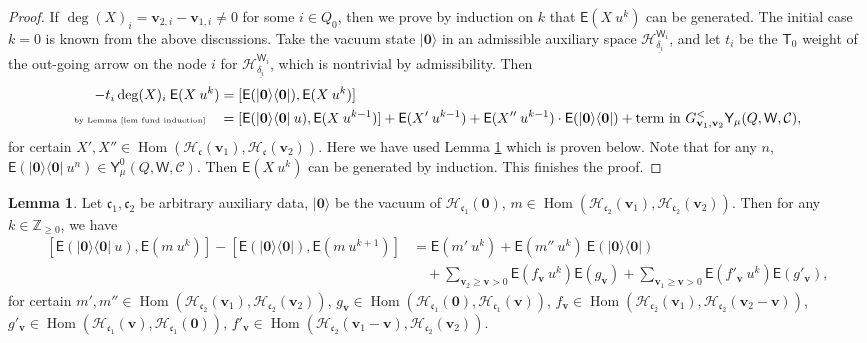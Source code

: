 \documentclass[10pt]{amsart}
\theoremstyle{definition}
\newtheorem{Lemma}[Theorem]{Lemma}
\numberwithin{equation}{section}
\newcommand{\bZ}{\mathbb{Z}}
\newcommand{\bv}{\mathbf{v}}
\newcommand{\cH}{\mathcal{H}}
\newcommand{\sT}{\mathsf{T}}
\newcommand{\sW}{\mathsf{W}}
\newcommand{\Hom}{\operatorname{Hom}}
\begin{document}
\begin{proof}
If $\deg(X)_i=\bv_{2,i}-\bv_{1,i}\neq 0$ for some $i\in Q_0$, then we prove by induction on $k$ that $\mathsf E(X\: u^k)$ can be generated. The initial case $k=0$ is known from the above discussions. Take the vacuum state $|\mathbf 0\rangle$ in an admissible auxiliary space $\cH^{\sW_i}_{\underline{\delta_i}}$, and let $t_i$ be the $\sT_0$ weight of the out-going arrow on the node $i$ for $\cH^{\sW_i}_{\underline{\delta_i}}$, which is nontrivial by admissibility. Then 
\begin{align*}
    -t_i\deg(X)_i\:\mathsf E(X\:u^k)&=[\mathsf E(|\mathbf 0\rangle\langle\mathbf 0|),\mathsf E(X\:u^k)]\\
    \text{\tiny by Lemma \ref{lem fund induction}}\quad&=[\mathsf E(|\mathbf 0\rangle\langle\mathbf 0|\:u),\mathsf E(X\: u^{k-1})]+\mathsf E(X'\: u^{k-1})+\mathsf E(X''\: u^{k-1})\cdot\mathsf E(|\mathbf 0\rangle\langle\mathbf 0|)+\text{term in }G^<_{\bv_1,\bv_2}\mathsf Y_\mu(Q,\sW,\mathcal C),
\end{align*}
for certain $X',X''\in \Hom(\cH_{\mathfrak{c}}(\bv_1),\cH_{\mathfrak{c}}(\bv_2))$. Here we have used Lemma \ref{lem fund induction} which is proven below. Note that for any $n$, $\mathsf E(|\mathbf 0\rangle\langle\mathbf 0|\:u^n)\in \mathsf Y^0_\mu(Q,\sW,\mathcal C)$. Then $\mathsf E(X\:u^k)$ can be generated by induction. This finishes the proof.
\end{proof}


\begin{Lemma}\label{lem fund induction}
Let $\mathfrak{c}_1,\mathfrak{c}_2$ be arbitrary auxiliary data, $|\mathbf 0\rangle$ be the vacuum of $ \cH_{\mathfrak{c}_1}(\mathbf 0)$, $m\in \Hom(\cH_{\mathfrak{c}_2}(\bv_1),\cH_{\mathfrak{c}_2}(\bv_2))$. Then for any $k\in \bZ_{\geqslant 0}$, we have
\begin{align}\label{fund induction}
[\mathsf E(|\mathbf 0\rangle\langle\mathbf 0|\: u),\mathsf E(m\: u^{k})]-[\mathsf E(|\mathbf 0\rangle\langle\mathbf 0|),\mathsf E(m\: u^{k+1})]&=\mathsf E(m'\: u^{k})+\mathsf E(m''\: u^{k})\:\mathsf E(|\mathbf 0\rangle\langle\mathbf 0|)\\ \nonumber
&\quad +\sum_{\bv_2\geqslant\bv> 0}\mathsf E(f_{\bv}\: u^{k})\mathsf E(g_{\bv})+\sum_{\bv_1\geqslant\bv> 0}\mathsf E(f'_{\bv}\: u^{k}) \mathsf E(g'_{\bv}),
\end{align}
for certain $m',m''\in \Hom(\cH_{\mathfrak{c}_2}(\bv_1),\cH_{\mathfrak{c}_2}(\bv_2))$, $g_{\bv}\in \Hom(\cH_{\mathfrak{c}_1}(\mathbf 0),\cH_{\mathfrak{c}_1}(\bv))$, $f_{\bv}\in \Hom(\cH_{\mathfrak{c}_2}(\bv_1),\cH_{\mathfrak{c}_2}(\bv_2-\bv))$, $g'_{\bv}\in \Hom(\cH_{\mathfrak{c}_1}(\bv),\cH_{\mathfrak{c}_1}(\mathbf 0))$, $f'_{\bv}\in \Hom(\cH_{\mathfrak{c}_2}(\bv_1-\bv),\cH_{\mathfrak{c}_2}(\bv_2))$.
\end{Lemma}
\end{document}
